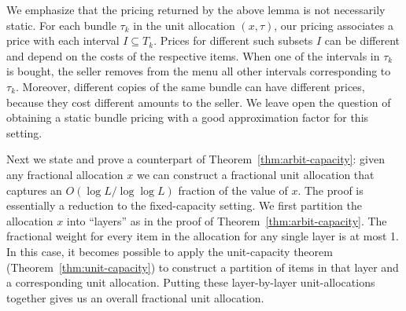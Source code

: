 We emphasize that the pricing returned by the above lemma is not
necessarily static. For each bundle $\tau_k$ in the unit allocation
$(x,\tau)$, our pricing associates a price with each interval
$I\subseteq T_k$. Prices for different such subsets $I$ can be
different and depend on the costs of the respective items. When one of
the intervals in $\tau_k$ is bought, the seller removes from the menu
all other intervals corresponding to $\tau_k$. Moreover, different
copies of the same bundle can have different prices, because they cost
different amounts to the seller. We leave open the question of
obtaining a static bundle pricing with a good approximation factor for
this setting.

Next we state and prove a counterpart of
Theorem~\ref{thm:arbit-capacity}: given any fractional allocation $x$
we can construct a fractional unit allocation that captures an
$O(\log L/\log\log L)$ fraction of the value of $x$. The proof is
essentially a reduction to the fixed-capacity setting. We first
partition the allocation $x$ into ``layers'' as in the proof of
Theorem~\ref{thm:arbit-capacity}. The fractional weight for every item
in the allocation for any single layer is at most 1. In this case, it
becomes possible to apply the unit-capacity theorem
(Theorem~\ref{thm:unit-capacity}) to construct a
partition of items in that layer and a corresponding unit
allocation. Putting these layer-by-layer unit-allocations together
gives us an overall fractional unit allocation.






